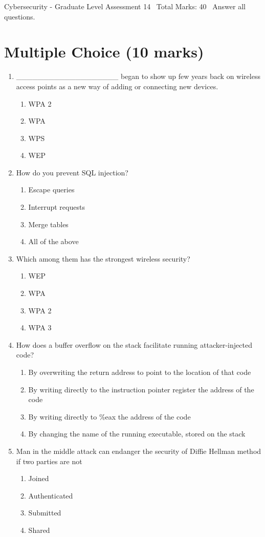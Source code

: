 \documentclass[12pt]{article}
\begin{document}
\begin{center}
Cybersecurity - Graduate Level Assessment 14 \
Total Marks: 40 \
Answer all questions.
\end{center}

\section*{Multiple Choice (10 marks)}
\begin{enumerate}[label=\arabic*.]
\item \_\_\_\_\_\_\_\_\_\_\_\_\_\_\_\_\_\_\_ began to show up few years back on wireless access points as a new way of adding or connecting new devices.
\begin{enumerate}[label=(\alph*)]
    \item WPA 2
    \item WPA
    \item WPS
    \item WEP
\end{enumerate}
\item How do you prevent SQL injection?
\begin{enumerate}[label=(\alph*)]
    \item Escape queries
    \item Interrupt requests
    \item Merge tables
    \item All of the above
\end{enumerate}
\item Which among them has the strongest wireless security?
\begin{enumerate}[label=(\alph*)]
    \item WEP
    \item WPA
    \item WPA 2
    \item WPA 3
\end{enumerate}
\item How does a buffer overflow on the stack facilitate running attacker-injected code?
\begin{enumerate}[label=(\alph*)]
    \item By overwriting the return address to point to the location of that code
    \item By writing directly to the instruction pointer register the address of the code
    \item By writing directly to \%eax the address of the code
    \item By changing the name of the running executable, stored on the stack
\end{enumerate}
\item Man in the middle attack can endanger the security of Diffie Hellman method if two parties are not
\begin{enumerate}[label=(\alph*)]
    \item Joined
    \item Authenticated
    \item Submitted
    \item Shared
\end{enumerate}
\end{enumerate}
\end{document}
